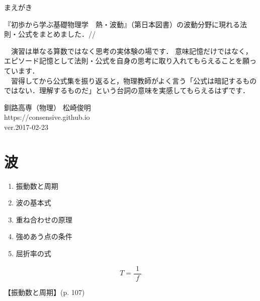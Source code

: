 \documentclass[10pt]{jarticle}
\begin{document}
\addtocounter{page}{-1}
\thispagestyle{empty}

まえがき\\

{\scriptsize
『初歩から学ぶ基礎物理学　熱・波動』（第日本図書）の波動分野に現れる法則・公式をまとめました．//

　演習は単なる算数ではなく思考の実体験の場です．
意味記憶だけではなく，エピソード記憶として法則・公式を自身の思考に取り入れてもらえることを願っています．\\

　習得してから公式集を振り返ると，物理教師がよく言う「公式は暗記するものではない．理解するものだ」という台詞の意味を実感してもらえるはずです．


\vfill
\hfill 釧路高専（物理） 松崎俊明\\
\hfill https://consensive.github.io\\

\vskip-3mm \hfill ver.2017-02-23\\
}



\addtocounter{page}{-1}
\thispagestyle{empty}
\tableofcontents



\newpage
\addtocounter{page}{-1}
\thispagestyle{empty}
\section{波}

\begin{enumerate}
\small
\itemsep-4mm
\item 振動数と周期\\
\item 波の基本式\\
\item 重ね合わせの原理\\
\item 強めあう点の条件\\
\item 屈折率の式\\
\end{enumerate}




\newpage
\[
T = \frac{1}{\; f \;}
\]


\vskip3mm
【振動数と周期】{\footnotesize (p. 107)}
\end{document}
